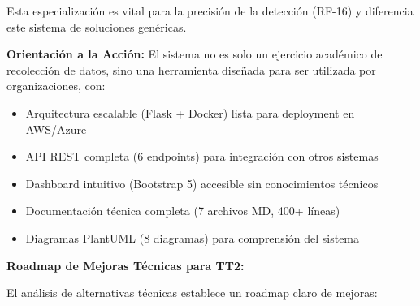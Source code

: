 Esta especialización es vital para la precisión de la detección (RF-16) y diferencia este sistema de soluciones genéricas.
    
\textbf{Orientación a la Acción:} El sistema no es solo un ejercicio académico de recolección de datos, sino una herramienta diseñada para ser utilizada por organizaciones, con:

\begin{itemize}
    \item Arquitectura escalable (Flask + Docker) lista para deployment en AWS/Azure
    \item API REST completa (6 endpoints) para integración con otros sistemas
    \item Dashboard intuitivo (Bootstrap 5) accesible sin conocimientos técnicos
    \item Documentación técnica completa (7 archivos MD, 400+ líneas)
    \item Diagramas PlantUML (8 diagramas) para comprensión del sistema
\end{itemize}

\textbf{Roadmap de Mejoras Técnicas para TT2:}

El análisis de alternativas técnicas establece un roadmap claro de mejoras:

